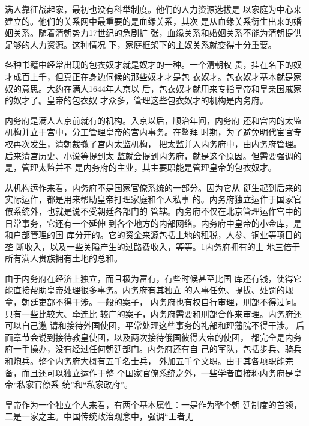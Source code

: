 满人靠征战起家，最初也没有科举制度。他们的人力资源选拔是%
以家庭为中心来建立的。他们的关系网中最重要的是血缘关系，其次%
是从血缘关系衍生出来的婚姻关系。随着清朝势力17世纪的急剧扩%
张，血缘关系和婚姻关系不能为清朝提供足够的人力资源。这种情况%
下，家庭框架下的主奴关系就变得十分重要。%
\par
各种书籍中经常出现的包衣奴才就是奴才的一种。一个清朝权%
贵，挂在名下的奴才成百上千，但真正在身边伺候的那些奴才才是包%
衣奴才。包衣奴才基本就是家奴的意思。大约在满人1644年人京以%
后，包衣奴才就用来专指皇帝和皇亲国戚家的奴才了。皇帝的包衣奴%
才众多，管理这些包衣奴才的机构是内务府。%
\par
内务府是满人人京前就有的机构。入京以后，顺治年间，内务府%
还和宫内的太监机构并立于宫中，分工管理皇帝的宫内事务。在鳌拜%
时期，为了避免明代宦官专权再次发生，清朝裁撤了宫内太监机构，%
把太监并入内务府中，由内务府管理。后来清宫历史、小说等提到太%
监就会提到内务府，就是这个原因。但需要强调的是，管理太监并不%
是内务府的主业，其主要职能是管理皇帝的包衣奴才。%
\par
从机构运作来看，内务府不是国家官僚系统的一部分。因为它从%
诞生起到后来的实际运作，都是用来帮助皇帝打理家庭和个人私事%
的。内务府独立运作于国家官僚系统外，也就是说不受朝廷各部门的%
管辖。内务府不仅在北京管理运作宫中的日常事务，它还有一个延伸%
到各个地方的内部网络。内务府中皇帝的小金库，是和户部管理的国%
库分开的。它的资金来源包括土地的租税，人参、铜业等项目的垄%
断收入，以及一些关隘产生的过路费收入，等等。1内务府拥有的土%
地三倍于所有满人贵族拥有土地的总和。%
\par
由于内务府在经济上独立，而且极为富有，有些时候甚至比国%
库还有钱，使得它能直接帮助皇帝处理很多事务。内务府有其独立%
的人事任免、提拔、处罚的规章，朝廷吏部不得干涉。一般的案子，%
内务府也有权自行审理，刑部不得过问。只有一些比较大、牵连比%
较广的案子，内务府需要和刑部合作来审理。内务府还可以自己邀%
请和接待外国使团，平常处理这些事务的礼部和理藩院不得干涉。%
后面章节会说到接待教皇使团，以及两次接待俄国彼得大帝的使团，%
都完全是内务府一手操办，没有经过任何朝廷部门。内务府还有自%
己的军队，包括步兵、骑兵和炮兵。整个内务府大概有五千名士兵，%
外加五千个文职。由于其各项职能完备，而且还可以独立运作于整%
个国家官僚系统之外，一些学者直接称内务府是皇帝“私家官僚系%
统”和“私家政府”。%
\par
皇帝作为一个独立个人来看，有两个基本属性：一是作为整个朝%
廷制度的首领，二是一家之主。中国传统政治观念中，强调“王者无%
